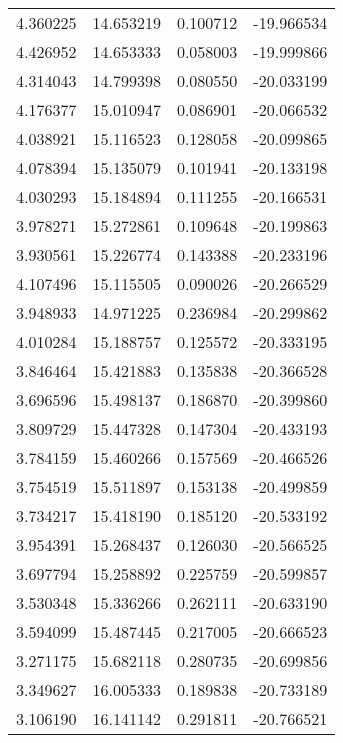 \begin{tabular}{rrrr}
        4.360225 &        14.653219 &    0.100712 & -19.966534 \\
        4.426952 &        14.653333 &    0.058003 & -19.999866 \\
        4.314043 &        14.799398 &    0.080550 & -20.033199 \\
        4.176377 &        15.010947 &    0.086901 & -20.066532 \\
        4.038921 &        15.116523 &    0.128058 & -20.099865 \\
        4.078394 &        15.135079 &    0.101941 & -20.133198 \\
        4.030293 &        15.184894 &    0.111255 & -20.166531 \\
        3.978271 &        15.272861 &    0.109648 & -20.199863 \\
        3.930561 &        15.226774 &    0.143388 & -20.233196 \\
        4.107496 &        15.115505 &    0.090026 & -20.266529 \\
        3.948933 &        14.971225 &    0.236984 & -20.299862 \\
        4.010284 &        15.188757 &    0.125572 & -20.333195 \\
        3.846464 &        15.421883 &    0.135838 & -20.366528 \\
        3.696596 &        15.498137 &    0.186870 & -20.399860 \\
        3.809729 &        15.447328 &    0.147304 & -20.433193 \\
        3.784159 &        15.460266 &    0.157569 & -20.466526 \\
        3.754519 &        15.511897 &    0.153138 & -20.499859 \\
        3.734217 &        15.418190 &    0.185120 & -20.533192 \\
        3.954391 &        15.268437 &    0.126030 & -20.566525 \\
        3.697794 &        15.258892 &    0.225759 & -20.599857 \\
        3.530348 &        15.336266 &    0.262111 & -20.633190 \\
        3.594099 &        15.487445 &    0.217005 & -20.666523 \\
        3.271175 &        15.682118 &    0.280735 & -20.699856 \\
        3.349627 &        16.005333 &    0.189838 & -20.733189 \\
        3.106190 &        16.141142 &    0.291811 & -20.766521 \\

\end{tabular}
